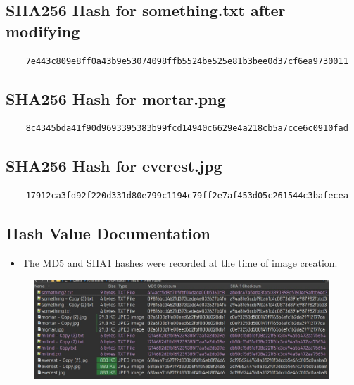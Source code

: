 \documentclass[11pt]{article}
\begin{document}
\subsection{SHA256 Hash for something.txt after modifying}
\begin{verbatim}
    7e443c809e8ff0a43b9e53074098ffb5524be525e81b3bee0d37cf6ea9730011
\end{verbatim}

\subsection{SHA256 Hash for mortar.png}
\begin{verbatim}
    8c4345bda41f90d9693395383b99fcd14940c6629e4a218cb5a7cce6c0910fad
\end{verbatim}

\subsection{SHA256 Hash for everest.jpg}
\begin{verbatim}
    17912ca3fd92f220d331d80e799c1194c79ff2e7af453d05c261544c3bafecea
\end{verbatim}

\subsection{Hash Value Documentation}
\begin{itemize}
    \item The MD5 and SHA1 hashes were recorded at the time of image creation.
\end{itemize}
\begin{figure}[H]
    \centering
    \includegraphics[width=0.99\textwidth]{checksums.jpg}
    \caption{}
    \label{fig:1}
\end{figure}
\end{document}
